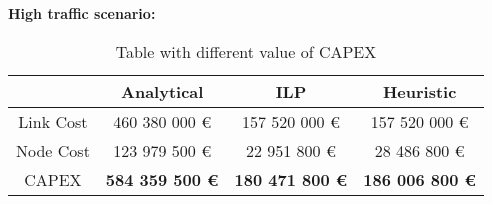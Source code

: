 \vspace{11pt}
\textbf{High traffic scenario:}\\

\begin{table}[h!]
\centering
\begin{tabular}{| c | c | c | c |}
 \hline
   & Analytical & ILP & Heuristic \\
 \hline\hline
 Link Cost & 460 380 000 \euro & 157 520 000 \euro & 157 520 000 \euro \\
 Node Cost & 123 979 500 \euro & 22 951 800 \euro & 28 486 800 \euro \\
 CAPEX & \textbf{584 359 500 \euro} & \textbf{180 471 800 \euro} & \textbf{186 006 800 \euro} \\
 \hline
\end{tabular}
\caption{Table with different value of CAPEX }
\label{table_comparative_transp_sur_ref_3}
\end{table}

